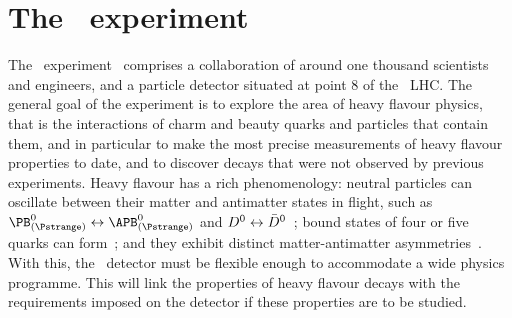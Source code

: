 \chapter{The \lhcb\ experiment}
\label{chap:intro:lhcb}

The \lhcb\ experiment~\cite{Alves:2008zz,Aaij:2014jba} comprises a 
collaboration of around one thousand scientists and engineers, and a particle 
detector situated at point 8 of the \cern\ \ac{LHC}.
The general goal of the experiment is to explore the area of heavy flavour 
physics, that is the interactions of charm and beauty quarks and particles that 
contain them, and in particular to make the most precise measurements of heavy 
flavour properties to date, and to discover decays that were not observed by 
previous experiments.
Heavy flavour has a rich phenomenology: neutral particles can oscillate between 
their matter and antimatter states in flight, such as $\PBds \leftrightarrow 
\APBds$ and $D^{0} \leftrightarrow 
\bar{D}^{0}$~\cite{Abulencia:2006ze,Aaij:2012nva}; bound states of four or five 
quarks can form~\cite{Aaij:2014jqa,Aaij:2015tga}; and they exhibit distinct 
matter-antimatter 
asymmetries~\cite{Aubert:2001nu,Abe:2001xe,Aaij:2012kz,Aaij:2013iua,Aaij:2016cla}.
With this, the \lhcb\ detector must be flexible enough to accommodate a wide 
physics programme.
This  will link the properties of heavy 
flavour decays with the requirements imposed on the detector if these 
properties are to be studied.



